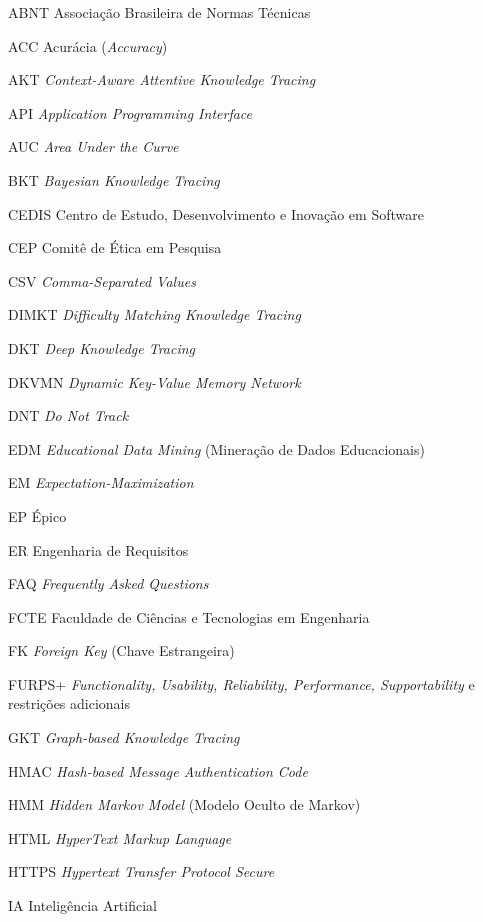 
\begin{siglas}
  \item[ABNT] Associação Brasileira de Normas Técnicas
  \item[ACC] Acurácia (\textit{Accuracy})
  \item[AKT] \textit{Context-Aware Attentive Knowledge Tracing}
  \item[API] \textit{Application Programming Interface}
  \item[AUC] \textit{Area Under the Curve}
  \item[BKT] \textit{Bayesian Knowledge Tracing}
  \item[CEDIS] Centro de Estudo, Desenvolvimento e Inovação em Software
  \item[CEP] Comitê de Ética em Pesquisa
  \item[CSV] \textit{Comma-Separated Values}
  \item[DIMKT] \textit{Difficulty Matching Knowledge Tracing}
  \item[DKT] \textit{Deep Knowledge Tracing}
  \item[DKVMN] \textit{Dynamic Key-Value Memory Network}
  \item[DNT] \textit{Do Not Track}
  \item[EDM] \textit{Educational Data Mining} (Mineração de Dados Educacionais)
  \item[EM] \textit{Expectation-Maximization}
  \item[EP] Épico
  \item[ER] Engenharia de Requisitos
  \item[FAQ] \textit{Frequently Asked Questions}
  \item[FCTE] Faculdade de Ciências e Tecnologias em Engenharia
  \item[FK] \textit{Foreign Key} (Chave Estrangeira)
  \item[FURPS+] \textit{Functionality, Usability, Reliability, Performance, Supportability} e restrições adicionais
  \item[GKT] \textit{Graph-based Knowledge Tracing}
  \item[HMAC] \textit{Hash-based Message Authentication Code}
  \item[HMM] \textit{Hidden Markov Model} (Modelo Oculto de Markov)
  \item[HTML] \textit{HyperText Markup Language}
  \item[HTTPS] \textit{Hypertext Transfer Protocol Secure}
  \item[IA] Inteligência Artificial

\end{siglas}

